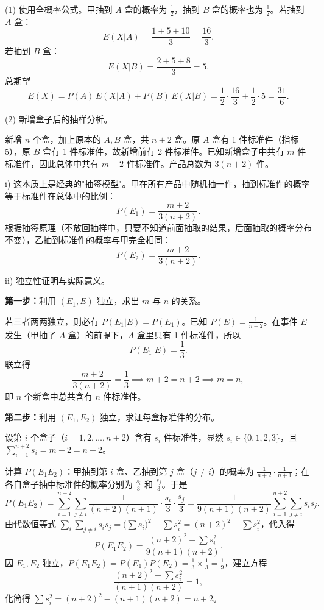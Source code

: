 ﻿\documentclass[lang=cn,11pt]{elegantbook}
\begin{document}
\begin{solution}
(1) 使用全概率公式。甲抽到 \(A\) 盒的概率为 \(\frac{1}{2}\)，抽到 \(B\) 盒的概率也为 \(\frac{1}{2}\)。若抽到 \(A\) 盒：
\[E(X|A) = \frac{1+5+10}{3} = \frac{16}{3}.\]
若抽到 \(B\) 盒：
\[E(X|B) = \frac{2+5+8}{3} = 5.\]
总期望
\[E(X) = P(A)\,E(X|A) + P(B)\,E(X|B) = \frac{1}{2}\cdot\frac{16}{3} + \frac{1}{2}\cdot 5 = \frac{31}{6}.\]

(2) 新增盒子后的抽样分析。

新增 \(n\) 个盒，加上原本的 \(A,B\) 盒，共 \(n+2\) 盒。原 \(A\) 盒有 1 件标准件（指标 5），原 \(B\) 盒有 1 件标准件，故新增前有 2 件标准件。已知新增盒子中共有 \(m\) 件标准件，因此总体中共有 \(m+2\) 件标准件。产品总数为 \(3(n+2)\) 件。

i) 这本质上是经典的"抽签模型"。甲在所有产品中随机抽一件，抽到标准件的概率等于标准件在总体中的比例：
\[P(E_1) = \frac{m+2}{3(n+2)}.\]
根据抽签原理（不放回抽样中，只要不知道前面抽取的结果，后面抽取的概率分布不变），乙抽到标准件的概率与甲完全相同：
\[P(E_2) = \frac{m+2}{3(n+2)}.\]

ii) 独立性证明与实际意义。

\textbf{第一步：}利用 \((E_1,E)\) 独立，求出 \(m\) 与 \(n\) 的关系。

若三者两两独立，则必有 \(P(E_1|E) = P(E_1)\)。已知 \(P(E) = \frac{1}{n+2}\)。在事件 \(E\) 发生（甲抽了 \(A\) 盒）的前提下，\(A\) 盒里只有 1 件标准件，所以
\[P(E_1|E) = \frac{1}{3}.\]
联立得
\[\frac{m+2}{3(n+2)} = \frac{1}{3} \implies m+2 = n+2 \implies m = n,\]
即 \(n\) 个新盒中总共含有 \(n\) 件标准件。

\textbf{第二步：}利用 \((E_1,E_2)\) 独立，求证每盒标准件的分布。

设第 \(i\) 个盒子（\(i=1,2,\dots,n+2\)）含有 \(s_i\) 件标准件，显然 \(s_i \in \{0,1,2,3\}\)，且 \(\sum_{i=1}^{n+2} s_i = m+2 = n+2\)。

计算 \(P(E_1 E_2)\)：甲抽到第 \(i\) 盒、乙抽到第 \(j\) 盒（\(j \neq i\)）的概率为 \(\frac{1}{n+2}\cdot\frac{1}{n+1}\)；在各自盒子抽中标准件的概率分别为 \(\frac{s_i}{3}\) 和 \(\frac{s_j}{3}\)。于是
\[
P(E_1 E_2) = \sum_{i=1}^{n+2}\sum_{j \neq i} \frac{1}{(n+2)(n+1)}\cdot\frac{s_i}{3}\cdot\frac{s_j}{3}
= \frac{1}{9(n+1)(n+2)}\sum_{i=1}^{n+2}\sum_{j \neq i}s_is_j.
\]
由代数恒等式 \(\displaystyle\sum_{i}\sum_{j \neq i}s_is_j = \bigl(\sum s_i\bigr)^2 - \sum s_i^2 = (n+2)^2 - \sum s_i^2\)，代入得
\[
P(E_1 E_2) = \frac{(n+2)^2 - \sum s_i^2}{9(n+1)(n+2)}.
\]
因 \(E_1, E_2\) 独立，\(P(E_1 E_2) = P(E_1)P(E_2) = \frac{1}{3}\times\frac{1}{3} = \frac{1}{9}\)，建立方程
\[
\frac{(n+2)^2 - \sum s_i^2}{(n+1)(n+2)} = 1,
\]
化简得 \(\displaystyle\sum s_i^2 = (n+2)^2 - (n+1)(n+2) = n+2\)。


\end{solution}
\end{document}
